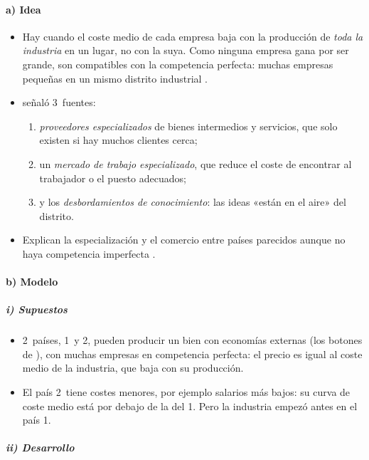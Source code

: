 \documentclass[11pt]{article}
\begin{document}
\paragraph{a) Idea}

\begin{itemize}
\item Hay  cuando el coste medio de cada empresa baja con la producción de \emph{toda la industria} en un lugar, no con la suya\nocite{Marshall1890Principles}. Como ninguna empresa gana por ser grande, son compatibles con la competencia perfecta: muchas empresas pequeñas en un mismo distrito industrial .
\item {} señaló 3~fuentes:
  \begin{enumerate}
  \item \emph{proveedores especializados} de bienes intermedios y servicios, que solo existen si hay muchos clientes cerca;
  \item un \emph{mercado de trabajo especializado}, que reduce el coste de encontrar al trabajador o el puesto adecuados;
  \item y los \emph{desbordamientos de conocimiento}: las ideas «están en el aire» del distrito.
  \end{enumerate}
\item Explican la especialización y el comercio entre países parecidos aunque no haya competencia imperfecta .
\end{itemize}

\paragraph{b) Modelo}

\subparagraph{i) Supuestos}

\begin{itemize}
\item 2~países, 1~y 2, pueden producir un bien con economías externas (los botones de \textcite[cap.~7]{KrugmanObstfeldMelitz2018International}), con muchas empresas en competencia perfecta: el precio es igual al coste medio de la industria, que baja con su producción.
\item El país 2~tiene costes menores, por ejemplo salarios más bajos: su curva de coste medio está por debajo de la del 1. Pero la industria empezó antes en el país 1.
\end{itemize}

\subparagraph{ii) Desarrollo}
\end{document}
